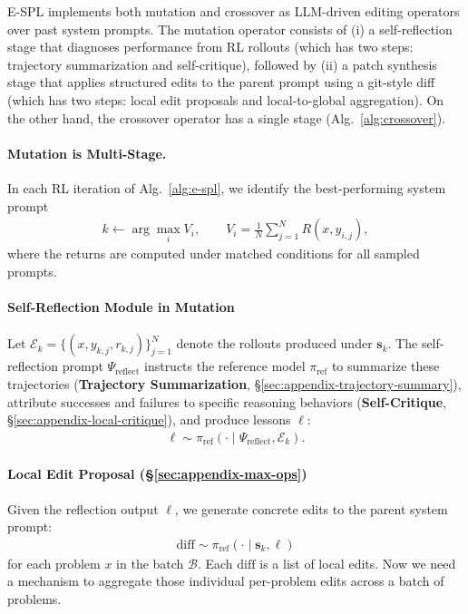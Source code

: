 \documentclass{article}
\theoremstyle{plain}
\theoremstyle{definition}
\theoremstyle{remark}
\begin{document}
E-SPL implements both mutation and crossover as LLM-driven editing operators over past system prompts. The mutation operator consists of (i) a self-reflection stage that diagnoses performance from RL rollouts (which has two steps: trajectory summarization and self-critique), followed by (ii) a patch synthesis stage that applies structured edits to the parent prompt using a git-style diff (which has two steps: local edit proposals and local-to-global aggregation). On the other hand, the crossover operator has a single stage (Alg.~\ref{alg:crossover}).

\paragraph{Mutation is Multi-Stage.}
In each RL iteration of Alg.~\ref{alg:e-spl}, we identify the best-performing system prompt
\begin{align}
k \leftarrow \arg\max_i V_i, \qquad V_i = \frac{1}{N}\sum_{j=1}^N R(x,y_{i,j}),
\end{align}
where the returns are computed under matched conditions for all sampled prompts.

\paragraph{Self-Reflection Module in Mutation} Let $\mathcal{E}_k = \{(x,y_{k,j},r_{k,j})\}_{j=1}^N$ denote the rollouts produced under $\mathbf{s}_k$. 
The self-reflection prompt $\Psi_{\text{reflect}}$ instructs the reference model $\pi_{\text{ref}}$ to summarize these trajectories (\textbf{Trajectory Summarization}, \S\ref{sec:appendix-trajectory-summary}), attribute successes and failures to specific reasoning behaviors (\textbf{Self-Critique}, \S\ref{sec:appendix-local-critique}), and produce lessons $\ell$:
\begin{align}
\ell \sim \pi_{\text{ref}}(\cdot \mid \Psi_{\text{reflect}}, \mathcal{E}_k).
\end{align}
\paragraph{Local Edit Proposal (\S\ref{sec:appendix-max-ops})}
Given the reflection output $\ell$, we generate concrete edits to the parent system prompt:
\begin{align}
\mathrm{diff} \sim \pi_{\text{ref}}(\cdot \mid \mathbf{s}_k, \ell)
\end{align}
for each problem $x$ in the batch $\mathcal{B}$. Each $\mathrm{diff}$ is a list of local edits. Now we need a mechanism to aggregate those individual per-problem edits across a batch of problems.
\end{document}

